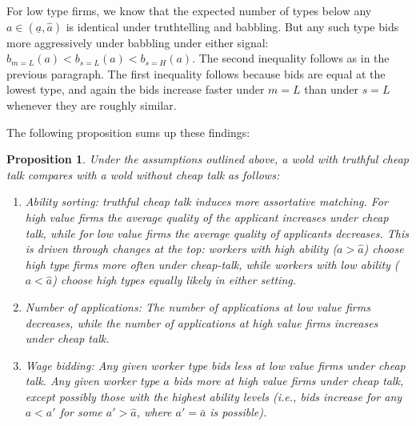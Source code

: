 \documentclass[12pt]{article}
\newtheorem{proposition}[theorem]{Proposition}
\begin{document}
For low type firms, we know that the expected number of types below any $a\in (\underline{a},\hat{a})$ is identical under truthtelling and babbling.
But any such type bids more aggressively under babbling under either signal: $b_{m=L}(a)<b_{s=L}(a)<b_{s=H}(a).$
The second inequality follows as in the previous paragraph.
The first inequality follows because bids are equal at the lowest type, and again the bids increase faster under $m=L$ than under $s=L$ whenever they are roughly similar. 


The following proposition sums up these findings: 

\begin{proposition}\label{comparison}
Under the assumptions outlined above, a wold with truthful cheap talk compares with a wold without cheap talk as follows:
\begin{enumerate}
    \item Ability sorting: truthful cheap talk induces more assortative matching. For high value firms the average quality of the applicant increases under cheap talk, while for low value firms the average quality of applicants decreases. This is driven through changes at the top: workers with high ability ($a>\hat{a}$) choose high type firms more often under cheap-talk, while workers with low ability ($a< \hat{a}$) choose high types equally likely in either setting.
    \item Number of applications: The number of applications at low value firms decreases, while the number of applications at high value firms increases under cheap talk. 
    \item Wage bidding: Any given worker type bids less at low value firms under cheap talk. Any given worker type $a$ bids more at high value firms under cheap talk, except possibly those with the highest ability levels (i.e., bids increase for any $a<a'$ for some $a'>\hat{a}$, where $a'=\bar{a}$ is possible).
\end{enumerate}

\end{proposition}

\end{document}
